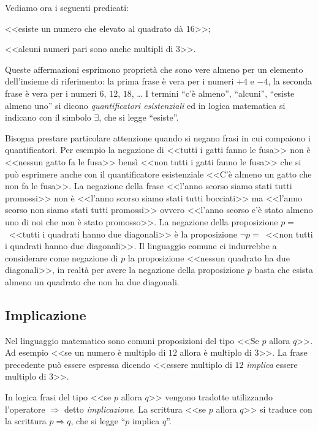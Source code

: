 Vediamo ora i seguenti predicati:
\begin{itemize*}
\item <<esiste un numero che elevato al quadrato dà $16$>>;
\item <<alcuni numeri pari sono anche multipli di $3$>>.
\end{itemize*}
Queste affermazioni esprimono proprietà che sono vere almeno per un elemento dell'insieme di riferimento: la prima frase è vera per i numeri $+4$ e $-4$, la seconda frase è vera per i numeri $6$, $12$, $18$, \ldots
I termini ``c'è almeno'', ``alcuni'', ``esiste almeno uno'' si dicono \emph{quantificatori esistenziali} ed in logica matematica si indicano con il simbolo $\exists$, che si legge ``esiste''.

Bisogna prestare particolare attenzione quando si negano frasi in cui compaiono i quantificatori. Per esempio la negazione di <<tutti i gatti fanno le fusa>> non è <<nessun gatto fa le fusa>> bensì <<non tutti i gatti fanno le fusa>> che si può esprimere anche con il quantificatore esistenziale <<C'è almeno un gatto che non fa le fusa>>.
La negazione della frase <<l'anno scorso siamo stati tutti promossi>> non è <<l'anno scorso siamo stati tutti bocciati>> ma <<l'anno scorso non siamo stati tutti promossi>> ovvero <<l'anno scorso c'è stato almeno uno di noi che non è stato promosso>>.
La negazione della proposizione $p=$~<<tutti i quadrati hanno due diagonali>> è la proposizione ${\lnot}p=$~<<non tutti i quadrati hanno due diagonali>>.
Il linguaggio comune ci indurrebbe a considerare come negazione di $p$ la proposizione <<nessun quadrato ha due diagonali>>, in realtà per avere la negazione della proposizione $p$ basta che esista almeno un quadrato che non ha due diagonali.

\subsection{Implicazione}

Nel linguaggio matematico sono comuni proposizioni del tipo <<Se $p$ allora $q$>>. Ad esempio <<se un numero è multiplo di $12$ allora è multiplo di $3$>>. La frase precedente può essere espressa dicendo <<essere multiplo di $12$ \emph{implica} essere multiplo di $3$>>.

In logica frasi del tipo <<se $p$ allora $q$>> vengono tradotte utilizzando l'operatore $\Rightarrow$ detto \emph{implicazione}.
La scrittura <<se $p$ allora $q$>> si traduce con la scrittura $p\Rightarrow q$, che si legge ``$p$ implica $q$''.

